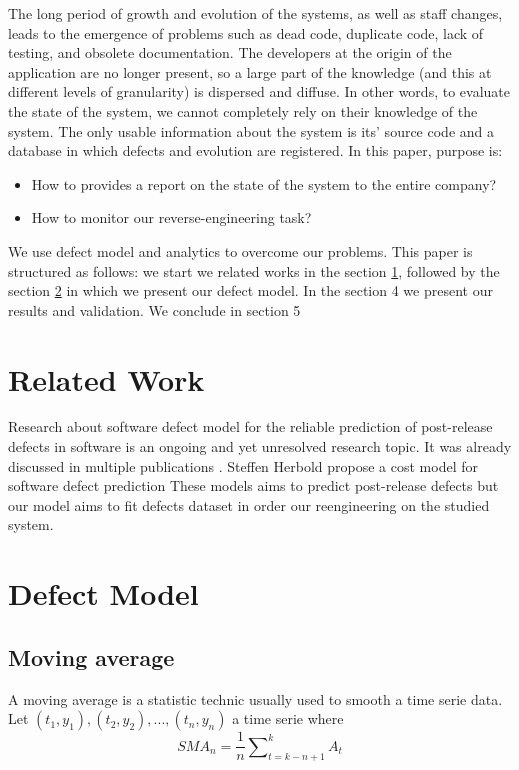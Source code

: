 \documentclass[10pt,conference]{IEEEtran}
\begin{document}
The long period of growth and evolution of the systems, as well as staff changes, leads to the emergence of problems such as dead code, duplicate code, lack of testing, and obsolete documentation. 
The developers at the origin of the application are no longer present, so a large part of the knowledge (and this at different levels of granularity) is dispersed and diffuse. 
In other words, to evaluate the state of the system, we cannot completely rely on their knowledge of the system.
The only usable information about the system is  its' source code and a database in which defects and evolution are registered.
 In this paper,  purpose is:
\begin{itemize}
\item How to provides a report on the state of the system to the entire company?
\item How to monitor our reverse-engineering task?
\end{itemize}
We use defect model and analytics to overcome our problems.
 This paper is structured as follows: we start we related works in the section \ref{sec:related-work}, followed by  the section \ref{sec:defectModel}  in which we present our defect model. 
 In the section 4 we present our results and validation. We  conclude in section 5 
 

\section{Related Work}\label{sec:related-work}
Research about software defect model for the reliable prediction of post-release defects in software is an ongoing and yet unresolved research topic. It was already discussed in multiple  publications \cite{Catal09,Hall2012, Hoss2017}. 
Steffen Herbold \cite{Herb19} propose a cost model for software defect prediction
These models aims to predict post-release defects but our model aims to fit  defects dataset  in order our reengineering on the studied system.   
\section{Defect Model}\label{sec:defectModel}
\subsection{Moving average}
A moving average is a statistic technic usually used to smooth a time serie data. Let $ (t_1,y_1) , (t_2,y_2) , . . ., (t_n,y_n) $ a time serie  where
\begin{equation*} SMA_{n}=\frac{1}{n}\sum\nolimits_{t=k-n+1}^{k}A_{t}\tag{1} \end{equation*}
\end{document}
